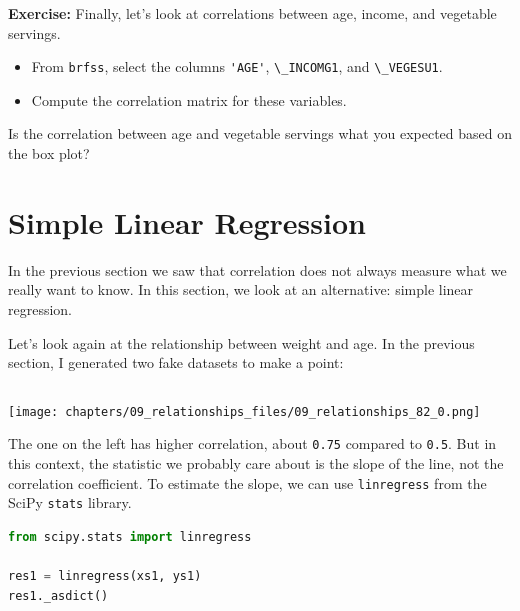 \textbf{Exercise:} Finally, let's look at correlations between age,
income, and vegetable servings.

\begin{itemize}

\item
  From \passthrough{\lstinline!brfss!}, select the columns
  \passthrough{\lstinline!'AGE'!}, \passthrough{\lstinline!\_INCOMG1!},
  and \passthrough{\lstinline!\_VEGESU1!}.
\item
  Compute the correlation matrix for these variables.
\end{itemize}

Is the correlation between age and vegetable servings what you expected
based on the box plot?

\hypertarget{simple-linear-regression}{%
\section{Simple Linear Regression}\label{simple-linear-regression}}

In the previous section we saw that correlation does not always measure
what we really want to know. In this section, we look at an alternative:
simple linear regression.

Let's look again at the relationship between weight and age. In the
previous section, I generated two fake datasets to make a point:

\begin{lstlisting}[language=Python,style=source]
\end{lstlisting}

\begin{center}
\texttt{[image: chapters/09\_relationships\_files/09\_relationships\_82\_0.png]}
\end{center}

The one on the left has higher correlation, about
\passthrough{\lstinline!0.75!} compared to
\passthrough{\lstinline!0.5!}. But in this context, the statistic we
probably care about is the slope of the line, not the correlation
coefficient. To estimate the slope, we can use
\passthrough{\lstinline!linregress!} from the SciPy
\passthrough{\lstinline!stats!} library.

\begin{lstlisting}[language=Python,style=source]
from scipy.stats import linregress

res1 = linregress(xs1, ys1)
res1._asdict()
\end{lstlisting}

